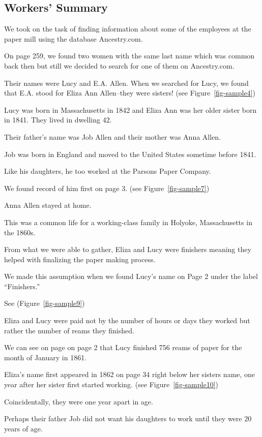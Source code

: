 \documentclass[
  letterpaper,
  DIV=11,
  numbers=noendperiod]{scrartcl}
\begin{document}
\hypertarget{workers-summary}{%
\subsection{Workers' Summary}\label{workers-summary}}

We took on the task of finding information about some of the employees
at the paper mill using the database Ancestry.com.

On page 259, we found two women with the same last name which was common
back then but still we decided to search for one of them on
Ancestry.com.

Their names were Lucy and E.A. Allen. When we searched for Lucy, we
found that E.A. stood for Eliza Ann Allen--they were sisters! (see
Figure~\ref{fig-sample4})

Lucy was born in Massachusetts in 1842 and Eliza Ann was her older
sister born in 1841. They lived in dwelling 42.

Their father's name was Job Allen and their mother was Anna Allen.

Job was born in England and moved to the United States sometime before
1841.

Like his daughters, he too worked at the Parsons Paper Company.

We found record of him first on page 3. (see Figure~\ref{fig-sample7})

Anna Allen stayed at home.

This was a common life for a working-class family in Holyoke,
Massachusetts in the 1860s.

From what we were able to gather, Eliza and Lucy were finishers meaning
they helped with finalizing the paper making process.

We made this assumption when we found Lucy's name on Page 2 under the
label ``Finishers.''

See (Figure~\ref{fig-sample9})

Eliza and Lucy were paid not by the number of hours or days they worked
but rather the number of reams they finished.

We can see on page on page 2 that Lucy finished 756 reams of paper for
the month of January in 1861.

Eliza's name first appeared in 1862 on page 34 right below her sisters
name, one year after her sister first started working. (see
Figure~\ref{fig-sample10})

Coincidentally, they were one year apart in age.

Perhaps their father Job did not want his daughters to work until they
were 20 years of age.
\end{document}
